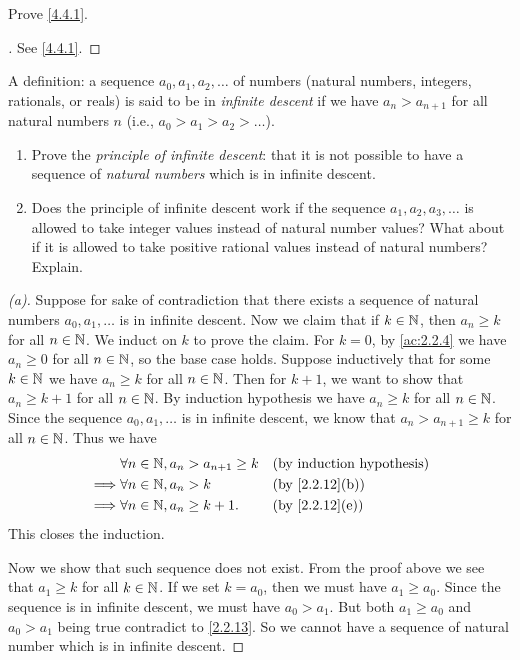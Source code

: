 \exercisesection

\begin{ex}\label{ex:4.4.1}
  Prove \cref{4.4.1}.
\end{ex}

\begin{proof}[]
  See \cref{4.4.1}.
\end{proof}

\begin{ex}\label{ex:4.4.2}
  A definition: a sequence \(a_0, a_1, a_2, \dots\) of numbers (natural numbers, integers, rationals, or reals) is said to be in \emph{infinite descent} if we have \(a_n > a_{n + 1}\) for all natural numbers \(n\)
  (i.e., \(a_0 > a_1 > a_2 > \dots\)).
  \begin{enumerate}
    \item Prove the \emph{principle of infinite descent}:
          that it is not possible to have a sequence of \emph{natural numbers} which is in infinite descent.
    \item Does the principle of infinite descent work if the sequence \(a_1, a_2, a_3, \dots\) is allowed to take integer values instead of natural number values?
          What about if it is allowed to take positive rational values instead of natural numbers?
          Explain.
  \end{enumerate}
\end{ex}

\begin{proof}[(a)]
  Suppose for sake of contradiction that there exists a sequence of natural numbers \(a_0, a_1, \dots\) is in infinite descent.
  Now we claim that if \(k \in \mathbb{N}\), then \(a_n \geq k\) for all \(n \in \mathbb{N}\).
  We induct on \(k\) to prove the claim.
  For \(k = 0\), by \cref{ac:2.2.4} we have \(a_n \geq 0\) for all \(n \in \mathbb{N}\), so the base case holds.
  Suppose inductively that for some \(k \in \mathbb{N}\) we have \(a_n \geq k\) for all \(n \in \mathbb{N}\).
  Then for \(k + 1\), we want to show that \(a_n \geq k + 1\) for all \(n \in \mathbb{N}\).
  By induction hypothesis we have \(a_n \geq k\) for all \(n \in \mathbb{N}\).
  Since the sequence \(a_0, a_1, \dots\) is in infinite descent, we know that \(a_n > a_{n + 1} \geq k\) for all \(n \in \mathbb{N}\).
  Thus we have
  \begin{align*}
             & \forall n \in \N, a_n > a_{n + 1} \geq k &  & \byIH          \\
    \implies & \forall n \in \N, a_n > k                &  & \by{2.2.12}[b] \\
    \implies & \forall n \in \N, a_n \geq k + 1.        &  & \by{2.2.12}[e]
  \end{align*}
  This closes the induction.

  Now we show that such sequence does not exist.
  From the proof above we see that \(a_1 \geq k\) for all \(k \in \mathbb{N}\).
  If we set \(k = a_0\), then we must have \(a_1 \geq a_0\).
  Since the sequence is in infinite descent, we must have \(a_0 > a_1\).
  But both \(a_1 \geq a_0\) and \(a_0 > a_1\) being true contradict to \cref{2.2.13}.
  So we cannot have a sequence of natural number which is in infinite descent.
\end{proof}

